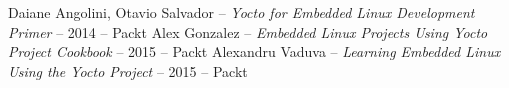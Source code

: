 \clearpage
{}

\begin{thebibliography}{99}
		{Daiane Angolini, Otavio Salvador  --
			\emph{Yocto for Embedded Linux Development Primer} -- 2014 -- Packt}
		{Alex Gonzalez  --
			\emph{Embedded Linux Projects Using Yocto Project Cookbook} -- 2015 -- Packt}
		{Alexandru Vaduva  --
			\emph{Learning Embedded Linux Using the Yocto Project} -- 2015 -- Packt}
\end{thebibliography}
